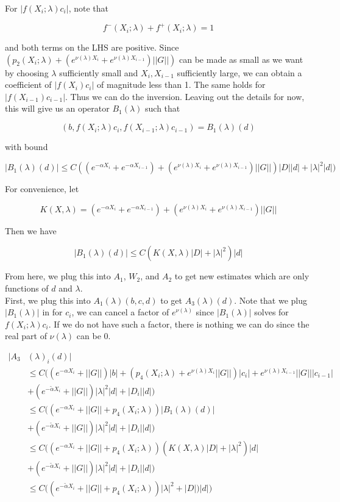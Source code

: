 \documentclass[12pt]{article}
\begin{document}
\begin{enumerate}
For $|f(X_i; \lambda) c_i|$, note that 

\[
f^-(X_i; \lambda) + f^+(X_i; \lambda) = 1
\]

and both terms on the LHS are positive. Since $(p_2(X_i; \lambda) + (e^{\nu(\lambda)X_i} + e^{\nu(\lambda)X_{i-1}})||G||)$ can be made as small as we want by choosing $\lambda$ sufficiently small and $X_i, X_{i-1}$ sufficiently large, we can obtain a coefficient of $|f(X_i)c_i|$ of magnitude less than 1. The same holds for $|f(X_{i-1})c_{i-1}|$. Thus we can do the inversion. Leaving out the details for now, this will give us an operator $B_1(\lambda)$ such that

\[
(b, f(X_i; \lambda) c_i, f(X_{i-1}; \lambda) c_{i-1} ) = B_1(\lambda)(d)
\]

with bound

\[
|B_1(\lambda)(d)| \leq C( (e^{-\alpha X_i} + e^{-\alpha X_{i-1}}) + (e^{\nu(\lambda)X_i} + e^{\nu(\lambda)X_{i-1}}) ||G||) |D||d| + |\lambda|^2 |d|)
\]

For convenience, let

\[
K(X, \lambda) = (e^{-\alpha X_i} + e^{-\alpha X_{i-1}}) + (e^{\nu(\lambda)X_i} + e^{\nu(\lambda)X_{i-1}})||G||
\]

Then we have

\[
|B_1(\lambda)(d)| \leq C( K(X, \lambda) |D|+ |\lambda|^2 )|d|
\]


From here, we plug this into $A_1$, $W_2$, and $A_2$ to get new estimates which are only functions of $d$ and $\lambda$.\\

First, we plug this into $A_1(\lambda)(b, c, d)$ to get $A_3(\lambda)(d)$. Note that we plug $|B_1(\lambda)|$ in for $c_i$, we can cancel a factor of $e^{\nu(\lambda)}$ since $|B_1(\lambda)|$ solves for $f(X_i; \lambda) c_i$. If we do not have such a factor, there is nothing we can do since the real part of $\nu(\lambda)$ can be 0.

\begin{align*}
|A_3&(\lambda)_i(d)| \\
&\leq C \Big( (e^{-\alpha X_i} + ||G||) |b|
+ ( p_4(X_i; \lambda) + e^{\nu(\lambda)X_i} ||G||) |c_i| + e^{\nu(\lambda)X_{i-1}} ||G|| |c_{i-1}| \\
&+ (e^{-\tilde{\alpha} X_i} + ||G||) |\lambda|^2 |d| + |D_i||d| \Big) \\
&\leq C \Big( (e^{-\alpha X_i} + ||G|| + p_4(X_i; \lambda) )|B_1(\lambda)(d)|\\
&+ (e^{-\tilde{\alpha} X_i} + ||G||) |\lambda|^2 |d| + |D_i||d| \Big) \\
&\leq C \Big( (e^{-\alpha X_i} + ||G|| + p_4(X_i; \lambda) )( K(X, \lambda) |D|+ |\lambda|^2 )|d|\\
&+ (e^{-\tilde{\alpha} X_i} + ||G||) |\lambda|^2 |d| + |D_i||d| \Big) \\
&\leq C \Big( (e^{-\tilde{\alpha} X_i} + ||G|| + p_4(X_i; \lambda) ) |\lambda|^2  + |D|)|d| \Big) \\
\end{align*}


\end{enumerate}
\end{document}
